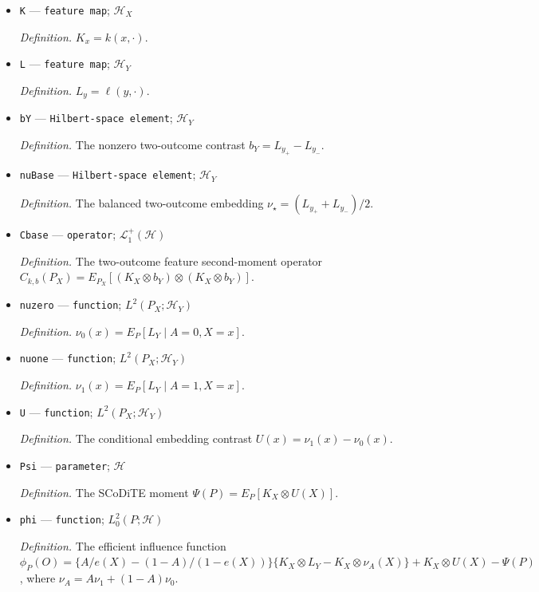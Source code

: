 \documentclass{article}
\begin{document}
\begin{itemize}
  \par\smallskip\noindent\emph{Definition.} The tensor RKHS \(\mathcal H=\mathcal H_X\otimes\mathcal H_Y\).
  \item \texttt{K} --- \texttt{feature map}; \(\mathcal H_X\)
  \par\smallskip\noindent\emph{Definition.} \(K_x=k(x,\cdot)\).
  \item \texttt{L} --- \texttt{feature map}; \(\mathcal H_Y\)
  \par\smallskip\noindent\emph{Definition.} \(L_y=\ell(y,\cdot)\).
  \item \texttt{bY} --- \texttt{Hilbert-\allowbreak{}space element}; \(\mathcal H_Y\)
  \par\smallskip\noindent\emph{Definition.} The nonzero two-outcome contrast \(b_Y=L_{y_+}-L_{y_-}\).
  \item \texttt{nuBase} --- \texttt{Hilbert-\allowbreak{}space element}; \(\mathcal H_Y\)
  \par\smallskip\noindent\emph{Definition.} The balanced two-outcome embedding \(\nu_\star=(L_{y_+}+L_{y_-})/2\).
  \item \texttt{Cbase} --- \texttt{operator}; \(\mathcal L_1^+(\mathcal H)\)
  \par\smallskip\noindent\emph{Definition.} The two-outcome feature second-moment operator \(C_{k,b}(P_X)=E_{P_X}[(K_X\otimes b_Y)\otimes(K_X\otimes b_Y)]\).
  \item \texttt{nuzero} --- \texttt{function}; \(L^2(P_X;\mathcal H_Y)\)
  \par\smallskip\noindent\emph{Definition.} \(\nu_0(x)=E_P[L_Y\mid A=0,X=x]\).
  \item \texttt{nuone} --- \texttt{function}; \(L^2(P_X;\mathcal H_Y)\)
  \par\smallskip\noindent\emph{Definition.} \(\nu_1(x)=E_P[L_Y\mid A=1,X=x]\).
  \item \texttt{U} --- \texttt{function}; \(L^2(P_X;\mathcal H_Y)\)
  \par\smallskip\noindent\emph{Definition.} The conditional embedding contrast \(U(x)=\nu_1(x)-\nu_0(x)\).
  \item \texttt{Psi} --- \texttt{parameter}; \(\mathcal H\)
  \par\smallskip\noindent\emph{Definition.} The SCoDiTE moment \(\Psi(P)=E_P[K_X\otimes U(X)]\).
  \item \texttt{phi} --- \texttt{function}; \(L^2_0(P;\mathcal H)\)
  \par\smallskip\noindent\emph{Definition.} The efficient influence function \(\phi_P(O)=\{A/e(X)-(1-A)/(1-e(X))\}\{K_X\otimes L_Y-K_X\otimes\nu_A(X)\}+K_X\otimes U(X)-\Psi(P)\), where \(\nu_A=A\nu_1+(1-A)\nu_0\).

\end{itemize}
\end{document}
